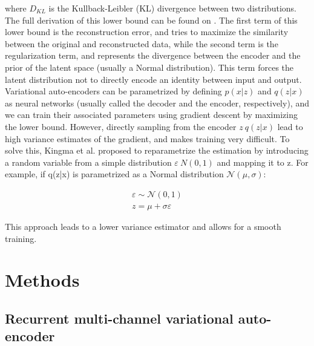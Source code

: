 where $D_{KL}$ is the Kullback-Leibler (KL) divergence between two distributions. The full derivation of this lower bound can be found on \cite{Kingma2014}. The first term of this lower bound is the reconstruction error, and tries to maximize the similarity between the original and reconstructed data, while the second term is the regularization term, and represents the divergence between the encoder and the prior of the latent space (usually a Normal distribution). This term forces the latent distribution not to directly encode an identity between input and output. \\

Variational auto-encoders can be parametrized by defining $p(x|z)$ and $q(z|x)$ as neural networks (usually called the decoder and the encoder, respectively), and we can train their associated parameters using gradient descent by maximizing the lower bound. However, directly sampling from the encoder $z~q(z|x)$ lead to high variance estimates of the gradient, and makes training very difficult. To solve this, Kingma et al. \cite{Kingma2015} proposed to reparametrize the estimation by introducing a random variable from a simple distribution $\varepsilon ~ N(0,1)$ and mapping it to z. For example, if q(z|x) is parametrized as a Normal distribution $\mathcal{N}(\mu, \sigma)$:

\begin{equation}
\begin{split}
    \varepsilon \sim \mathcal{N}(0,1) \\
    z = \mu + \sigma \varepsilon
\end{split}
\end{equation}

This approach leads to a lower variance estimator and allows for a smooth training.

\section{Methods}
\label{rnn:methods}

\subsection{Recurrent multi-channel variational auto-encoder}

